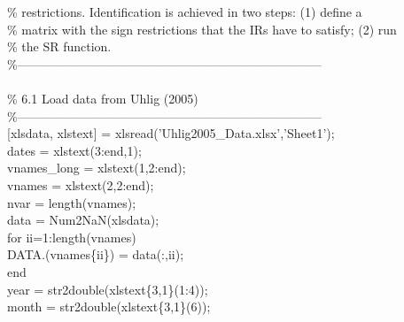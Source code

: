 \hspace{1mm}\textcolor{matlabgreen}{\% restrictions. Identification is achieved in two steps: (1) define a  }\\ 
\hspace{1mm}\textcolor{matlabgreen}{\% matrix with the sign restrictions that the IRs have to satisfy; (2) run  }\\ 
\hspace{1mm}\textcolor{matlabgreen}{\% the SR function.  }\\ 
\hspace{1mm}\textcolor{matlabgreen}{\%--------------------------------------------------------------------------  }\\ 
\hspace{1mm} \\ 
\hspace{1mm}\textcolor{matlabgreen}{\% 6.1 Load data from Uhlig (2005) }\\ 
\hspace{1mm}\textcolor{matlabgreen}{\%--------------------------------------------------------------------------  }\\ 
\hspace{1mm}[xlsdata, xlstext] = xlsread(\textcolor{matlabpurple}{'Uhlig2005\_Data.xlsx'},\textcolor{matlabpurple}{'Sheet1'}); \\ 
\hspace{1mm}dates = xlstext(3:end,1); \\ 
\hspace{1mm}vnames\_long = xlstext(1,2:end); \\ 
\hspace{1mm}vnames = xlstext(2,2:end); \\ 
\hspace{1mm}nvar = length(vnames); \\ 
\hspace{1mm}data   = Num2NaN(xlsdata); \\ 
\hspace{1mm}\textcolor{matlabblue}{for} ii=1:length(vnames) \\ 
\hspace{1mm}\hspace{5mm} DATA.(vnames\{ii\}) = data(:,ii); \\ 
\hspace{1mm}\textcolor{matlabblue}{end} \\ 
\hspace{1mm}year = str2double(xlstext\{3,1\}(1:4)); \\ 
\hspace{1mm}month = str2double(xlstext\{3,1\}(6)); \\ 
